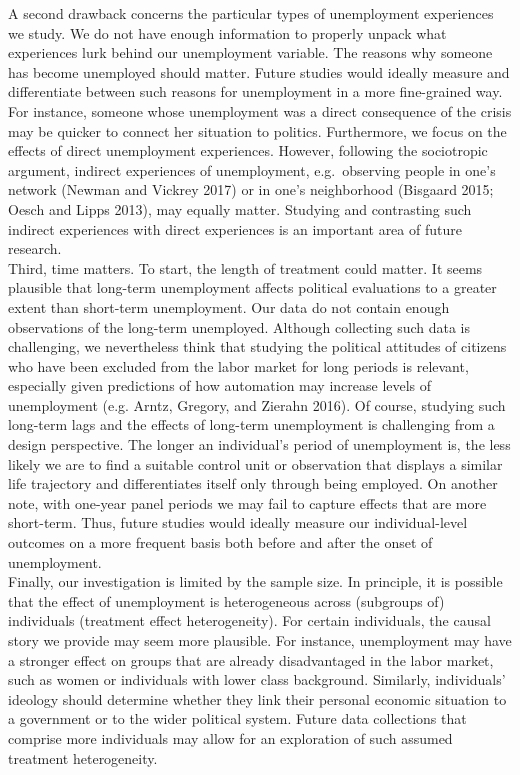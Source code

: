 \documentclass[12pt,]{article}
\begin{document}
A second drawback concerns the particular types of unemployment experiences we study. We do not have enough information to properly unpack what experiences lurk behind our unemployment variable. The reasons why someone has become unemployed should matter. Future studies would ideally measure and differentiate between such reasons for unemployment in a more fine-grained way. For instance, someone whose unemployment was a direct consequence of the crisis may be quicker to connect her situation to politics. Furthermore, we focus on the effects of direct unemployment experiences. However, following the sociotropic argument, indirect experiences of unemployment, e.g.~observing people in one's network (Newman and Vickrey 2017) or in one's neighborhood (Bisgaard 2015; Oesch and Lipps 2013), may equally matter. Studying and contrasting such indirect experiences with direct experiences is an important area of future research.\\
Third, time matters. To start, the length of treatment could matter. It seems plausible that long-term unemployment affects political evaluations to a greater extent than short-term unemployment. Our data do not contain enough observations of the long-term unemployed. Although collecting such data is challenging, we nevertheless think that studying the political attitudes of citizens who have been excluded from the labor market for long periods is relevant, especially given predictions of how automation may increase levels of unemployment (e.g. Arntz, Gregory, and Zierahn 2016). Of course, studying such long-term lags and the effects of long-term unemployment is challenging from a design perspective. The longer an individual's period of unemployment is, the less likely we are to find a suitable control unit or observation that displays a similar life trajectory and differentiates itself only through being employed. On another note, with one-year panel periods we may fail to capture effects that are more short-term. Thus, future studies would ideally measure our individual-level outcomes on a more frequent basis both before and after the onset of unemployment.\\
Finally, our investigation is limited by the sample size. In principle, it is possible that the effect of unemployment is heterogeneous across (subgroups of) individuals (treatment effect heterogeneity). For certain individuals, the causal story we provide may seem more plausible. For instance, unemployment may have a stronger effect on groups that are already disadvantaged in the labor market, such as women or individuals with lower class background. Similarly, individuals' ideology should determine whether they link their personal economic situation to a government or to the wider political system. Future data collections that comprise more individuals may allow for an exploration of such assumed treatment heterogeneity.
\end{document}
